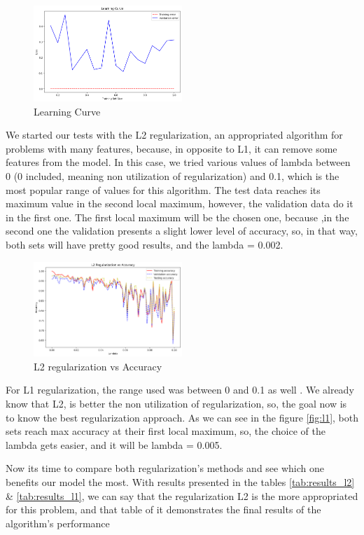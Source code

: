 \documentclass[12pt,a4paper,twocolumn]{article}
\begin{document}
\begin{figure}[H]
\includegraphics[width=0.5\textwidth]{images/learning_curve.png}
\centering
\caption{\label{fig:learning_curve} Learning Curve}
\end{figure}
\par We started our tests with the L2 regularization, an appropriated algorithm for problems with many features, because, in opposite to L1, it can remove some features from the model. In this case, we tried various values of lambda between 0 (0 included, meaning non utilization of regularization) and 0.1, which is the most popular range of values for this algorithm. The test data reaches its maximum value in the second local maximum, however, the validation data do it in the first one. The first local maximum will be the chosen one, because ,in the second one the validation presents a slight lower level of accuracy, so, in that way, both sets will have pretty good results, and the lambda = 0.002. 
\begin{figure}[H]
\includegraphics[width=0.5\textwidth]{images/l2.png}
\centering
\caption{\label{fig:l2} L2 regularization vs Accuracy}
\end{figure}
For L1 regularization, the range used was between 0 and 0.1 as well . We already know that L2, is better the non utilization of regularization, so, the goal now is to know the best regularization approach. As we can see in the figure \ref{fig:l1}, both sets reach max accuracy at their first local maximum, so, the choice of the lambda gets easier, and it will be lambda = 0.005.
\par Now its time to compare both regularization's methods and see which one benefits our model the most. With results presented in the tables \ref{tab:results_l2} \&  \ref{tab:results_l1}, we can say that the regularization L2 is the more appropriated for this problem, and that table of it demonstrates the final results of the algorithm's performance
\end{document}
